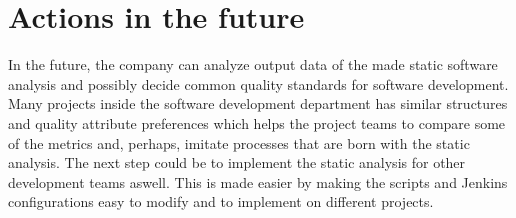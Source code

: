 \section{Actions in the future}


In the future, the company can analyze output data of the made static software analysis and possibly decide common quality standards for software development. Many projects inside the software development department has similar structures and quality attribute preferences which helps the project teams to compare some of the metrics and, perhaps, imitate processes that are born with the static analysis. The next step could be to implement the static analysis for other development teams aswell. This is made easier by making the scripts and Jenkins configurations easy to modify and to implement on different projects.







